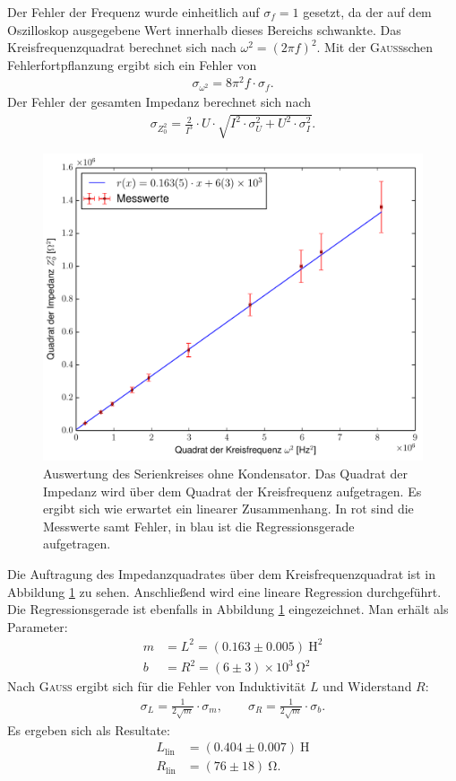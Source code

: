 \documentclass[12pt,a4paper,titlepage,headinclude]{scrartcl}
\numberwithin{equation}{section}
\newcommand{\mrm}[1]{\mathrm{#1}}
\newcommand{\person}[1]{\textsc{#1}}
\begin{document}
Der Fehler der Frequenz wurde einheitlich auf $\sigma_f=1$ gesetzt, da der auf dem Oszilloskop ausgegebene Wert innerhalb dieses Bereichs schwankte. Das Kreisfrequenzquadrat berechnet sich nach $\omega^2=\left( 2\pi f \right)^2$. Mit der \person{Gauss}schen Fehlerfortpflanzung ergibt sich ein Fehler von 
\begin{align}
	\sigma_{\omega^2}=8  \pi^{2}  f\cdot \sigma_{f}.
	\label{eq:sigmaomega}
\end{align}
 Der Fehler der gesamten Impedanz berechnet sich nach
\begin{align}
	\sigma_{Z_0^2}=\frac{2}{I^{3}} \cdot U \cdot \sqrt{I^{2} \cdot \sigma_{U}^{2} + U^{2} \cdot \sigma_{I}^{2}}.
	\label{eq:sigmaz0}
\end{align}
\begin{figure}[h!]
	\centering
	\includegraphics[width=\textwidth]{plot1.pdf}
	\caption{Auswertung des Serienkreises ohne Kondensator. Das Quadrat der Impedanz wird über dem Quadrat der Kreisfrequenz aufgetragen. Es ergibt sich wie erwartet ein linearer Zusammenhang. In rot sind die Messwerte samt Fehler, in blau ist die Regressionsgerade aufgetragen.}
	\label{fig:plot1}
\end{figure}

Die Auftragung des Impedanzquadrates über dem Kreisfrequenzquadrat ist in Abbildung \ref{fig:plot1} zu sehen. Anschließend wird eine lineare Regression durchgeführt. Die Regressionsgerade ist ebenfalls in Abbildung \ref{fig:plot1} eingezeichnet. Man erhält als Parameter:
\begin{align}
	m&=L^2=(0.163\pm0.005)~\mrm{H}^2\\
	b&=R^2=(6\pm3)\times 10^3~\mrm{\Omega}^2
	\label{eq:plot1}
\end{align}
Nach \person{Gauss} ergibt sich für die Fehler von Induktivität $L$ und Widerstand $R$:
\begin{align}
	\sigma_L=\frac{1}{2\sqrt{m}}\cdot\sigma_m,\qquad\sigma_R=\frac{1}{2\sqrt{m}}\cdot\sigma_b.
	\label{eq:sigma1}
\end{align}
Es ergeben sich als Resultate:
\begin{align}
	L_{\mrm{lin}}&=(0.404\pm0.007)~\mrm{H}\\
	R_{\mrm{lin}}&=(76\pm18)~\mrm{\Omega}.
	\label{eq:result1}
\end{align}
\newpage
\end{document}
